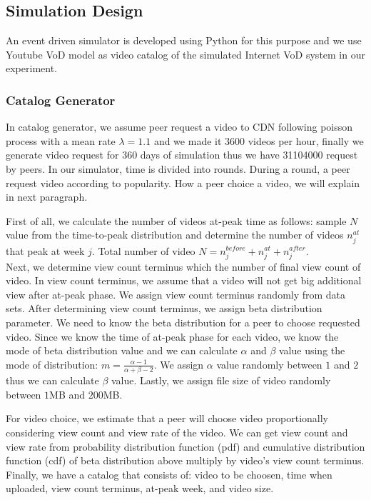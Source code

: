 \documentclass[conference]{IEEEtran}
\begin{document}
\subsection{Simulation Design}\label{simulationdesign}
An event driven simulator is developed using Python for this purpose and we use Youtube VoD model as video catalog of the simulated Internet VoD system in our experiment.

\subsubsection{Catalog Generator}
In catalog generator, we assume peer request a video to CDN following poisson process with a mean rate $\lambda=1.1$ \cite{4801529} and we made it 3600 videos per hour, finally we generate video request for 360 days of simulation thus we have 31104000 request by peers. 
In our simulator, time is divided into rounds. 
During a round, a peer request video according to popularity. 
How a peer choice a video, we will explain in next paragraph.

First of all, we calculate the number of videos at-peak time as follows: sample $N$ value from the time-to-peak distribution and determine the number of videos $n_j^{at}$ that peak at week $j$. 
Total number of video $N = n_j^{before} + n_j^{at} + n_j^{after}$.\\
Next, we determine view count terminus which the number of final view count of video.
In view count terminus, we assume that a video will not get big additional view after at-peak phase.
We assign view count terminus randomly from data sets.
After determining view count terminus, we assign beta distribution parameter. 
We need to know the beta distribution for a peer to choose requested video.  
Since we know the time of at-peak phase for each video, we know the mode of beta distribution value and we can calculate $\alpha$ and $\beta$ value using the mode of distribution: $m=\frac{\alpha-1}{\alpha + \beta - 2}$.  
We assign $\alpha$ value randomly between $1$ and $2$ thus we can calculate $\beta$ value.
Lastly, we assign file size of video randomly between $1$MB and $200$MB.

For video choice, we estimate that a peer will choose video proportionally considering view count and view rate of the video.   
We can get view count and view rate from probability distribution function (pdf) and cumulative distribution function (cdf) of beta distribution above multiply by video's view count terminus.
Finally, we have a catalog that consists of: video to be choosen, time when uploaded, view count terminus, at-peak week, and video size.
\end{document}
